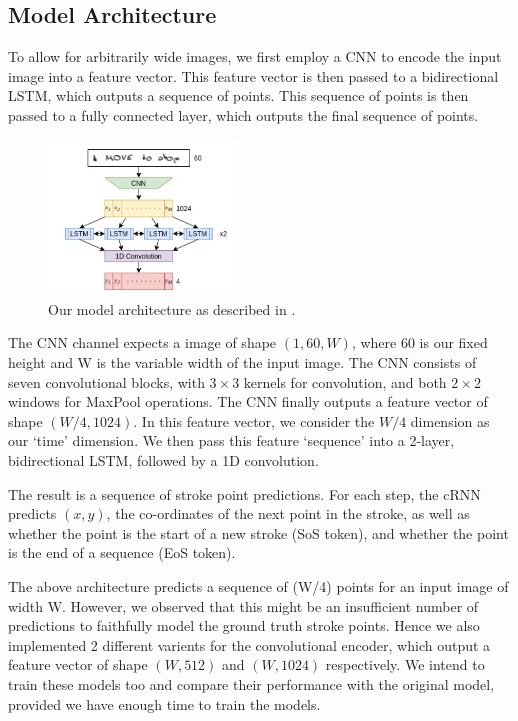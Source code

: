 \documentclass[10pt,twocolumn,letterpaper]{article}
\begin{document}
\subsection{Model Architecture}
To allow for arbitrarily wide images, we first employ a CNN to encode the input image into a feature vector. This feature vector is then passed to a bidirectional LSTM, which outputs a sequence of points. This sequence of points is then passed to a fully connected layer, which outputs the final sequence of points.
\begin{figure}[h]
  \centering
  \includegraphics[width=0.45\textwidth]{../latex-src/Images/str-model-architecture.jpeg}
  \caption{Our model architecture as described in \cite{image2stroke-Archibald}. }
  \label{fig:stroke-arch}
\end{figure}

The CNN channel expects a image of shape $(1, 60, W)$, where 60 is our fixed height and W is the variable width of the input image. The CNN consists of seven convolutional blocks, with $3 \times 3$ kernels for convolution, and both $2 \times 2$ windows for MaxPool operations. The CNN finally outputs a feature vector of shape $(W/4, 1024)$. In this feature vector, we consider the $W/4$ dimension as our `time' dimension. We then pass this feature `sequence' into a 2-layer, bidirectional LSTM, followed by a 1D convolution. 

The result is a sequence of stroke point predictions. For each step, the cRNN predicts $(x,y)$, the co-ordinates of the next point in the stroke, as well as whether the point is the start of a new stroke (SoS token), and whether the point is the end of a sequence (EoS token).

The above architecture predicts a sequence of (W/4) points for an input image of width W. However, we observed that this might be an insufficient number of predictions to faithfully model the ground truth stroke points. Hence we also implemented 2 different varients for the convolutional encoder, which output a feature vector of shape $(W, 512)$ and $(W, 1024)$ respectively. We intend to train these models too and compare their performance with the original model, provided we have enough time to train the models.
\end{document}
